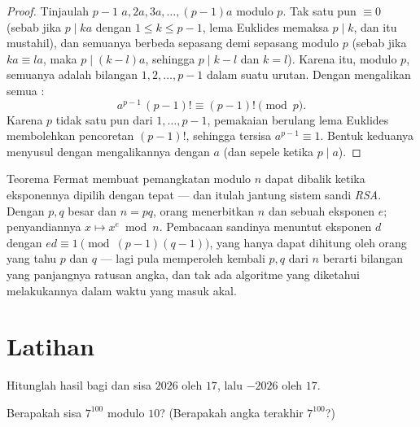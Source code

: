 \begin{proof}
Tinjaulah $p - 1$  $a, 2a, 3a, \dots, (p-1)a$ modulo $p$. Tak satu pun
$\equiv 0$ (sebab jika $p \mid ka$ dengan $1 \leq k \leq p-1$, lema Euklides memaksa
$p \mid k$, dan itu mustahil), dan semuanya berbeda sepasang demi sepasang modulo $p$
(sebab jika $ka \equiv la$, maka $p \mid (k - l)a$, sehingga $p \mid k - l$ dan $k = l$).
Karena itu, modulo $p$, semuanya adalah bilangan $1, 2, \dots, p-1$ dalam suatu urutan.
Dengan mengalikan semua :
\[
a^{p-1}\,(p-1)! \equiv (p-1)! \pmod p .
\]
Karena $p$ tidak  satu pun dari $1, \dots, p-1$, pemakaian berulang lema
Euklides membolehkan pencoretan $(p-1)!$, sehingga tersisa $a^{p-1} \equiv 1$. Bentuk
keduanya menyusul dengan mengalikannya dengan $a$ (dan sepele ketika $p \mid a$).
\end{proof}

\begin{example}\label{ex:g12:arith:rsa}
Teorema Fermat membuat pemangkatan modulo $n$ dapat dibalik ketika
eksponennya dipilih dengan tepat --- dan itulah jantung sistem sandi \emph{RSA}.
Dengan $p, q$  besar dan $n = pq$, orang menerbitkan $n$ dan sebuah
eksponen $e$; penyandiannya $x \mapsto x^e \bmod n$. Pembacaan sandinya menuntut
eksponen $d$ dengan $ed \equiv 1 \pmod{(p-1)(q-1)}$, yang hanya dapat dihitung
oleh orang yang tahu $p$ dan $q$ --- lagi pula memperoleh kembali $p, q$ dari $n$
berarti  bilangan yang panjangnya ratusan angka, dan tak ada algoritme
yang diketahui melakukannya dalam waktu yang masuk akal.
\end{example}

\section{Latihan}

\begin{exercise}[$\star$]\label{exo:g12:arith:1}
Hitunglah hasil bagi dan sisa  $2026$ oleh
$17$, lalu $-2026$ oleh $17$.
\end{exercise}

\begin{exercise}[$\star$]\label{exo:g12:arith:2}
Berapakah sisa $7^{100}$ modulo $10$? (Berapakah angka terakhir
$7^{100}$?)
\end{exercise}

